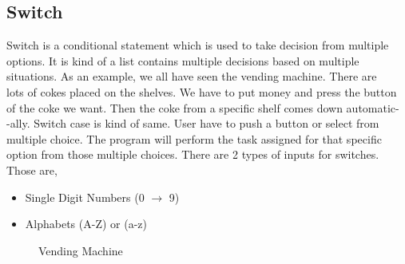 \documentclass[openany]{book}  %
\begin{document}
\subsection{Switch}
Switch is a conditional statement which is used to take decision from multiple \\
options. It is kind of a list contains multiple decisions based on multiple \\
situations. As an example, we all have seen the vending machine. There are \\
lots of cokes placed on the shelves. We have to put money and press the button \\
of the coke we want. Then the coke from a specific shelf comes down automatic-\\
-ally. Switch case is kind of same. User have to push a button or select from \\
multiple choice. The program will perform the task assigned for that specific \\
option from those multiple choices. There are 2 types of inputs for switches. \\
Those are,
\begin{itemize}
    \item Single Digit Numbers (0 $\to$ 9)
    \item Alphabets (A-Z) or (a-z)
\end{itemize}
% 
% 
\begin{figure}[htbp]
    \begin{center}
        \caption{Vending Machine\cite{Ref10}}
    \end{center}
\end{figure}
% 
%
\end{document}
